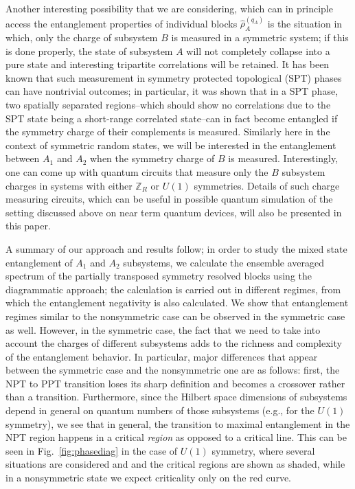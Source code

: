 \documentclass[aps,pra,reprint,superscriptaddress,twocolumn,notitlepage]{revtex4-1}
\numberwithin{equation}{section}
\begin{document}
Another interesting possibility that we are considering, which can in principle access the entanglement properties of individual blocks $\hat\rho_A^{(q_A)}$ is the situation in which, only the charge of subsystem $B$ is measured in a symmetric system; if this is done properly, the state of subsystem $A$ will not completely collapse into a pure state and interesting tripartite correlations will be retained. 
It has been known that such measurement in symmetry protected topological (SPT) phases can have nontrivial outcomes; in particular, it was shown \cite{Marvian2017} that in a SPT phase, two spatially separated regions--which should show no correlations due to the SPT state being a short-range correlated state--can in fact become entangled if the symmetry charge of their complements is measured.
Similarly here in the context of symmetric random states, we will be interested in the entanglement between $A_1$ and $A_2$ when the symmetry charge of $B$ is measured. Interestingly, one can come up with quantum circuits that measure only the $B$ subsystem charges in systems with either $\mathbb{Z}_R$ or $U(1)$ symmetries. 
Details of such charge measuring circuits, which can be useful in possible quantum simulation of the setting discussed above on near term quantum devices, will also be presented in this paper.


A summary of our approach and results follow; in order to study the mixed state entanglement of $A_1$ and $A_2$ subsystems, we calculate the ensemble averaged spectrum of the partially transposed symmetry resolved blocks using the diagrammatic approach; the calculation is carried out in different regimes, from which the entanglement negativity is also calculated. We show that entanglement regimes similar to the nonsymmetric case can be observed in the symmetric case as well. However, in the symmetric case, the fact that we need to take into account the charges of different subsystems adds to the richness and complexity of the entanglement behavior. In particular, major differences that appear between the symmetric case and the nonsymmetric one are as follows: first, the NPT to PPT transition loses its sharp definition and becomes a crossover rather than a transition. Furthermore, since the Hilbert space dimensions of subsystems depend in general on quantum numbers of those subsystems (e.g., for the $U(1)$ symmetry), we see that in general, the transition to maximal entanglement in the NPT region happens in a critical {\it region} as opposed to a critical line. This can be seen in Fig.~\ref{fig:phasediag} in the case of $U(1)$ symmetry, where several situations are considered and and the critical regions are shown as shaded, while in a nonsymmetric state we expect criticality only on the red curve.
\end{document}
